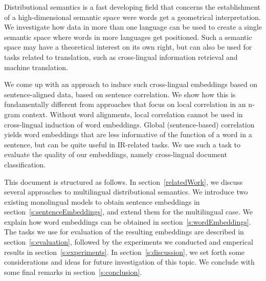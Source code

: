 









Distributional semantics is a fast developing field that concerns the establishment of a high-dimensional semantic space were words get a geometrical interpretation. We investigate how data in more than one language can be used to create a single semantic space where words in more languages get positioned. Such a semantic space may have a theoretical interest on its own right, but can also be used for tasks related to translation, such as cross-lingual information retrieval and machine translation. 

We come up with an approach to induce such cross-lingual embeddings based on sentence-aligned data, based on sentence correlation. We show how this is fundamentally different from approaches that focus on local correlation in an n-gram context. Without word alignments, local correlation cannot be used in cross-lingual induction of word embeddings. Global (sentence-based) correlation yields word embeddings that are less informative of the function of a word in a sentence, but can be quite useful in IR-related tasks. We use such a task to evaluate the quality of our embeddings, namely cross-lingual document classification.

This document is structured as follows. In section~\ref{relatedWork}, we discuss several  approaches to multilingual distributional semantics. We introduce two existing monolingual models to obtain sentence embeddings in section~\ref{s:sentenceEmbeddings}, and extend them for the multilingual case. We explain how word embeddings can be obtained in section~\ref{s:wordEmbeddings}. The tasks we use for evaluation of the resulting embeddings are described in section~\ref{s:evaluation}, followed by the experiments we conducted and emperical results in section~\ref{s:experiments}. In section~\ref{s:discussion}, we set forth some considerations and ideas for future investigation of this topic. We conclude with some final remarks in section~\ref{s:conclusion}.

